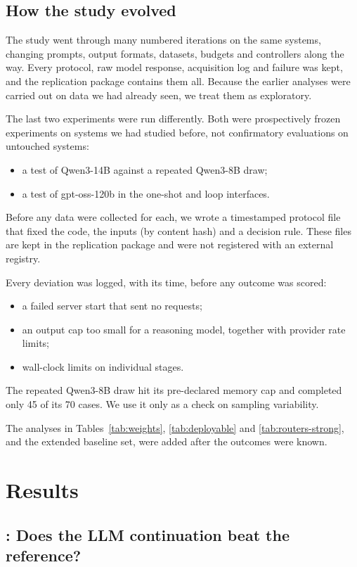 \subsection{How the study evolved}
\label{sec:history}

The study went through many numbered iterations on the same systems, changing prompts, output formats, datasets, budgets and controllers along the way. Every protocol, raw model response, acquisition log and failure was kept, and the replication package contains them all. Because the earlier analyses were carried out on data we had already seen, we treat them as exploratory.

The last two experiments were run differently. Both were prospectively frozen experiments on systems we had studied before, not confirmatory evaluations on untouched systems:
\begin{itemize}
  \item a test of Qwen3-14B against a repeated Qwen3-8B draw;
  \item a test of gpt-oss-120b in the one-shot and loop interfaces.
\end{itemize}
Before any data were collected for each, we wrote a timestamped protocol file that fixed the code, the inputs (by content hash) and a decision rule. These files are kept in the replication package and were not registered with an external registry.

Every deviation was logged, with its time, before any outcome was scored:
\begin{itemize}
  \item a failed server start that sent no requests;
  \item an output cap too small for a reasoning model, together with provider rate limits;
  \item wall-clock limits on individual stages.
\end{itemize}
The repeated Qwen3-8B draw hit its pre-declared memory cap and completed only 45 of its 70 cases. We use it only as a check on sampling variability.

The analyses in Tables~\ref{tab:weights}, \ref{tab:deployable} and \ref{tab:routers-strong}, and the extended baseline set, were added after the outcomes were known.

\section{Results}

\subsection{: Does the LLM continuation beat the reference?}
\label{sec:rq1}

